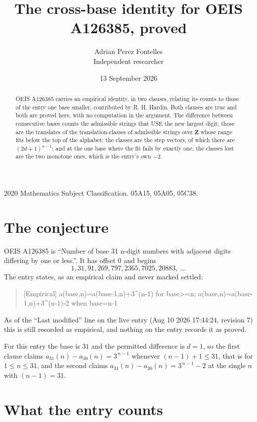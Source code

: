 \documentclass[11pt,a4paper]{article}
\title{The cross-base identity for OEIS A126385, proved}
\author{Adrian Perez Fontelles\\ \small Independent researcher}
\date{13 September 2026}
\theoremstyle{plain}
\theoremstyle{definition}
\begin{document}
\maketitle

\begin{abstract}
OEIS A126385 carries an empirical identity, in two clauses, relating its counts to those of the
entry one base smaller, contributed by R. H. Hardin. Both clauses are true and both are proved
here, with no computation in the argument. The difference between consecutive bases counts the
admissible strings that USE the new largest digit; those are the translates of the
translation-classes of admissible strings over $\mathbf{Z}$ whose range fits below the top of
the alphabet; the classes are the step vectors, of which there are $(2d+1)^{n-1}$; and at the
one base where the fit fails by exactly one, the classes lost are the two monotone ones, which
is the entry's own $-2$.
\end{abstract}

\noindent\small 2020 Mathematics Subject Classification. 05A15, 05A05, 05C38.\normalsize

\section{The conjecture}

OEIS A126385 is ``Number of base 31 n-digit numbers with adjacent digits differing by one or less.''. It has offset $0$ and begins
\[
1, 31, 91, 269, 797, 2365, 7025, 20883,\ \dots
\]
The entry states, as an empirical claim and never marked settled:
\begin{quote}
[Empirical] a(base,n)=a(base-1,n)+3\textasciicircum{}(n-1) for base>=n; a(base,n)=a(base-1,n)+3\textasciicircum{}(n-1)-2 when base=n-1
\end{quote}
As of the ``Last modified'' line on the live entry (Aug 10 2026 17:44:24, revision 7)
this is still recorded as empirical, and nothing on the entry records it as proved.

For this entry the base is $31$ and the permitted difference is $d=1$, so the first clause
claims $a_{31}(n)-a_{30}(n)=3^{\,n-1}$ whenever $(n-1)+1\le31$, that is for
$1\le n\le31$, and the second claims $a_{31}(n)-a_{30}(n)=3^{\,n-1}-2$ at the single
$n$ with $(n-1)=31$.

\section{What the entry counts}
\end{document}
